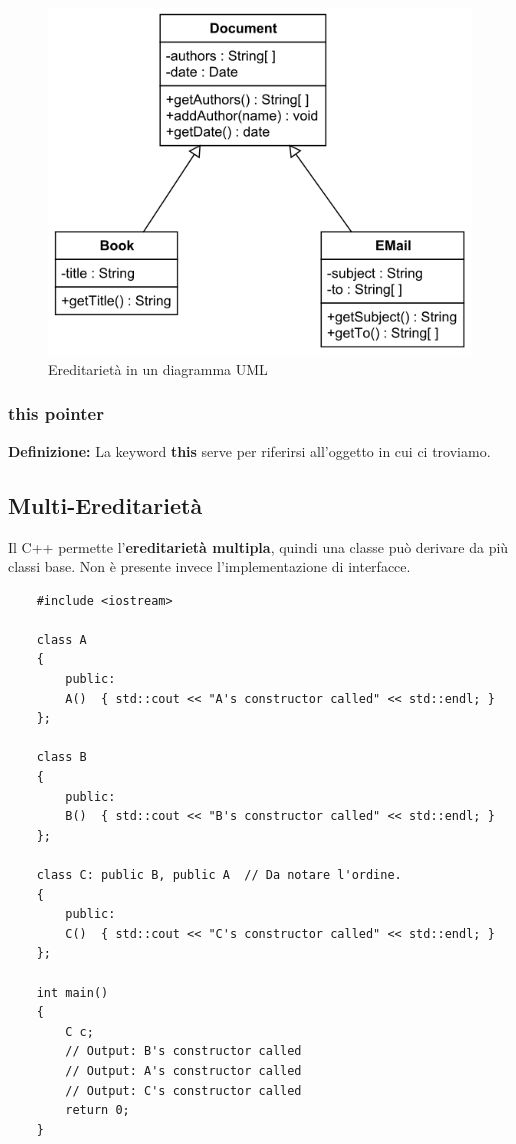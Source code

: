 \begin{figure}[ht]
	\centering
	\includegraphics[width=1\textwidth, height=1\textheight, keepaspectratio]{./imgs/inheritance_class_uml2.jpg}
	\caption{Ereditarietà in un diagramma UML}
	\label{fig:ereditarietà}
\end{figure}

\subsubsection{this pointer}

\textsf{\small \textbf{Definizione: } La keyword \textbf{this} serve per riferirsi all'oggetto in cui ci troviamo.} \\ %

\subsection{Multi-Ereditarietà}

\textsf{\small Il C++ permette l'\textbf{ereditarietà multipla}, quindi una classe può derivare da più classi base. Non è presente invece l'implementazione di interfacce.} \\

\begin{lstlisting}
	#include <iostream>
	
	class A
	{
		public:
		A()  { std::cout << "A's constructor called" << std::endl; }
	};
	
	class B
	{
		public:
		B()  { std::cout << "B's constructor called" << std::endl; }
	};
	
	class C: public B, public A  // Da notare l'ordine.
	{
		public:
		C()  { std::cout << "C's constructor called" << std::endl; }
	};
	
	int main()
	{
		C c;
		// Output: B's constructor called
		// Output: A's constructor called
		// Output: C's constructor called
		return 0;
	}
\end{lstlisting}

